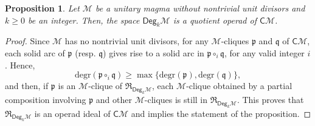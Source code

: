 \documentclass[10pt,reqno]{amsart}
\numberwithin{equation}{subsection}
\renewcommand{\geq}{\geqslant}
\newtheorem{Proposition}[Theorem]{Proposition}
\newcommand{\Mca}{\mathcal{M}}
\newcommand{\Pfr}{\mathfrak{p}}
\newcommand{\Qfr}{\mathfrak{q}}
\newcommand{\Cli}{\mathsf{C}}
\newcommand{\Deg}{\mathsf{Deg}}
\newcommand{\Rel}{\mathfrak{R}}
\newcommand{\Degr}{\mathrm{degr}}
\begin{document}
\begin{Proposition} \label{prop:quotient_Cli_M_degrees}
    Let $\Mca$ be a unitary magma without nontrivial unit divisors and
    $k \geq 0$ be an integer. Then, the space $\Deg_k\Mca$ is a quotient
    operad of $\Cli\Mca$.
\end{Proposition}
\begin{proof}
    Since $\Mca$ has no nontrivial unit divisors, for any $\Mca$-cliques
    $\Pfr$ and $\Qfr$ of $\Cli\Mca$, each solid arc of $\Pfr$ (resp.
    $\Qfr$) gives rise to a solid arc in $\Pfr \circ_i \Qfr$, for any
    valid integer $i$. Hence,
    \begin{equation}
        \Degr(\Pfr \circ_i \Qfr) \geq \max\{\Degr(\Pfr), \Degr(\Qfr)\},
    \end{equation}
    and then, if $\Pfr$ is an $\Mca$-clique of $\Rel_{\Deg_k\Mca}$,
    each $\Mca$-clique obtained by a partial composition involving
    $\Pfr$ and other $\Mca$-cliques is still in $\Rel_{\Deg_k\Mca}$.
    This proves that $\Rel_{\Deg_k\Mca}$ is an operad ideal of
    $\Cli\Mca$ and implies the statement of the proposition.
\end{proof}
\medskip
\end{document}
